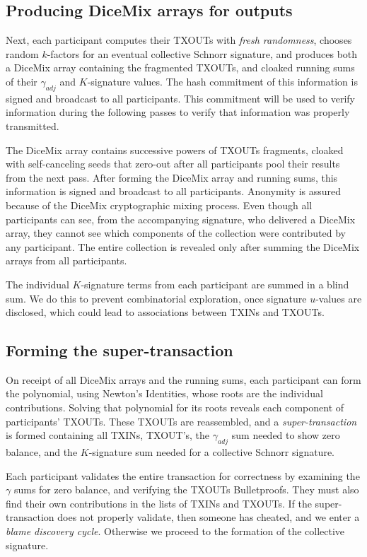 \documentclass[8pt,fleqn,openany]{book}
\begin{document}
{\subsection{Producing DiceMix arrays for outputs} 
Next, each participant computes their TXOUTs with \textit{fresh randomness}, chooses random $k$-factors for an eventual collective Schnorr signature, and produces both a DiceMix array containing the fragmented TXOUTs, and cloaked running sums of their $\gamma_{adj}$ and $K$-signature values. The hash commitment of this information is signed and broadcast to all participants. This commitment will be used to verify information during the following passes to verify that information was properly transmitted.

The DiceMix array contains successive powers of TXOUTs fragments, cloaked with self-canceling seeds that zero-out after all participants pool their results from the next pass. After forming the DiceMix array and running sums, this information is signed and broadcast to all participants. Anonymity is assured because of the DiceMix cryptographic mixing process. Even though all participants can see, from the accompanying signature, who delivered a DiceMix array, they cannot see which components of the collection were contributed by any participant. The entire collection is revealed only after summing the DiceMix arrays from all participants.

The individual $K$-signature terms from each participant are summed in a blind sum. We do this to prevent combinatorial exploration, once signature $u$-values are disclosed, which could lead to associations between TXINs and TXOUTs.

\subsection{Forming the super-transaction} 
On receipt of all DiceMix arrays and the running sums, each participant can form the polynomial, using Newton’s Identities, whose roots are the individual contributions. Solving that polynomial for its roots reveals each component of participants’ TXOUTs. These TXOUTs are reassembled, and a \textit{super-transaction} is formed containing all TXINs, TXOUT’s, the $\gamma_{adj}$ sum needed to show zero balance, and the $K$-signature sum needed for a collective Schnorr signature.

Each participant validates the entire transaction for correctness by examining the $\gamma$ sums for zero balance, and verifying the TXOUTs Bulletproofs. They must also find their own contributions in the lists of TXINs and TXOUTs. If the super-transaction does not properly validate, then someone has cheated, and we enter a \textit{blame discovery cycle}. Otherwise we proceed to the formation of the collective signature. 

}
\end{document}
